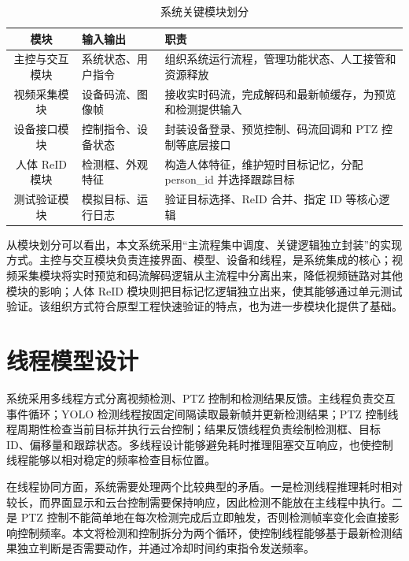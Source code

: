 \begin{table}[H]
    \centering
    \caption{系统关键模块划分}
    \label{tab:module-design}
    \begin{tabularx}{\textwidth}{c|X|X}
        \hline
        模块 & 输入输出 & 职责 \\
        \hline
        主控与交互模块 & 系统状态、用户指令 & 组织系统运行流程，管理功能状态、人工接管和资源释放 \\
        \hline
        视频采集模块 & 设备码流、图像帧 & 接收实时码流，完成解码和最新帧缓存，为预览和检测提供输入 \\
        \hline
        设备接口模块 & 控制指令、设备状态 & 封装设备登录、预览控制、码流回调和 PTZ 控制等底层接口 \\
        \hline
        人体 ReID 模块 & 检测框、外观特征 & 构造人体特征，维护短时目标记忆，分配 person\_id 并选择跟踪目标 \\
        \hline
        测试验证模块 & 模拟目标、运行日志 & 验证目标选择、ReID 合并、指定 ID 等核心逻辑 \\
        \hline
    \end{tabularx}
\end{table}

从模块划分可以看出，本文系统采用“主流程集中调度、关键逻辑独立封装”的实现方式。主控与交互模块负责连接界面、模型、设备和线程，是系统集成的核心；视频采集模块将实时预览和码流解码逻辑从主流程中分离出来，降低视频链路对其他模块的影响；人体 ReID 模块则把目标记忆逻辑独立出来，使其能够通过单元测试验证。该组织方式符合原型工程快速验证的特点，也为进一步模块化提供了基础。

\section{线程模型设计}

系统采用多线程方式分离视频检测、PTZ 控制和检测结果反馈。主线程负责交互事件循环；YOLO 检测线程按固定间隔读取最新帧并更新检测结果；PTZ 控制线程周期性检查当前目标并执行云台控制；结果反馈线程负责绘制检测框、目标 ID、偏移量和跟踪状态。多线程设计能够避免耗时推理阻塞交互响应，也使控制线程能够以相对稳定的频率检查目标位置。

在线程协同方面，系统需要处理两个比较典型的矛盾。一是检测线程推理耗时相对较长，而界面显示和云台控制需要保持响应，因此检测不能放在主线程中执行。二是 PTZ 控制不能简单地在每次检测完成后立即触发，否则检测帧率变化会直接影响控制频率。本文将检测和控制拆分为两个循环，使控制线程能够基于最新检测结果独立判断是否需要动作，并通过冷却时间约束指令发送频率。

